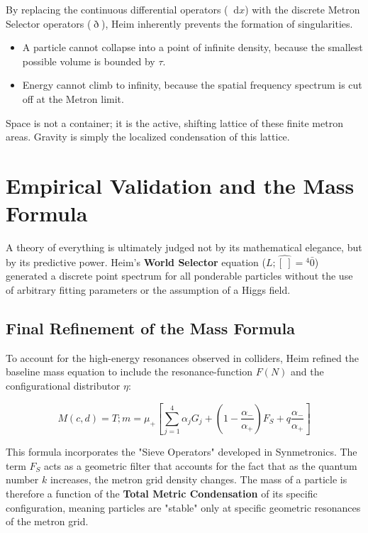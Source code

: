 \documentclass[11pt,a4paper,oneside]{article}
\newcommand{\ethop}{\eth}
\newcommand{\diff}{\mathop{}\!\mathrm{d}} %
\begin{document}
\begin{tcolorbox}[colback=white, colframe=theoryblue, title=\textbf{The Resolution of Quantum Infinities}]
By replacing the continuous differential operators ($\diff x$) with the discrete Metron Selector operators ($\ethop$), Heim inherently prevents the formation of singularities. 
\begin{itemize}
    \item A particle cannot collapse into a point of infinite density, because the smallest possible volume is bounded by $\tau$.
    \item Energy cannot climb to infinity, because the spatial frequency spectrum is cut off at the Metron limit.
\end{itemize}
Space is not a container; it is the active, shifting lattice of these finite metron areas. Gravity is simply the localized condensation of this lattice.
\end{tcolorbox}
\section{Empirical Validation and the Mass Formula}

A theory of everything is ultimately judged not by its mathematical elegance, but by its predictive power. Heim's \textbf{World Selector} equation ($L;\widehat{[\ ]} = {}^4\bar{0}$) generated a discrete point spectrum for all ponderable particles without the use of arbitrary fitting parameters or the assumption of a Higgs field.

\subsection{Final Refinement of the Mass Formula}
To account for the high-energy resonances observed in colliders, Heim refined the baseline mass equation to include the resonance-function $F(N)$ and the configurational distributor $\eta$:

\begin{equation}
    M(c,d) = T; m = \mu_+ \left[ \sum_{j=1}^{4} \alpha_j G_j + \left(1 - \frac{\alpha_-}{\alpha_+} \right) F_S + q \frac{\alpha_-}{\alpha_+} \right]
\end{equation}

This formula incorporates the "Sieve Operators" developed in Synmetronics. The term $F_S$ acts as a geometric filter that accounts for the fact that as the quantum number $k$ increases, the metron grid density changes. The mass of a particle is therefore a function of the \textbf{Total Metric Condensation} of its specific configuration, meaning particles are "stable" only at specific geometric resonances of the metron grid.
\end{document}

